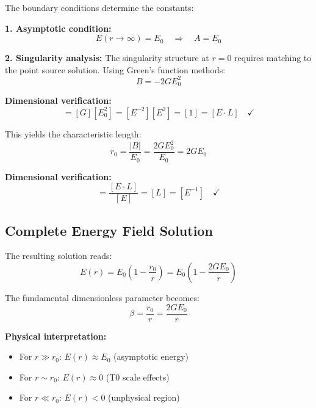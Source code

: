\documentclass[12pt,a4paper]{report}
\newcommand{\rzero}{r_0}                  %
\begin{document}
The boundary conditions determine the constants:

\textbf{1. Asymptotic condition:}
\begin{equation}
	E(r \to \infty) = E_0 \quad \Rightarrow \quad A = E_0
\end{equation}

\textbf{2. Singularity analysis:}
The singularity structure at $r = 0$ requires matching to the point source solution. Using Green's function methods:
\begin{equation}
	B = -2GE_0^2
\end{equation}

\textbf{Dimensional verification:}
\begin{equation}
	[B] = [G][E_0^2] = [E^{-2}][E^2] = [1] = [E \cdot L] \quad \checkmark
\end{equation}

This yields the characteristic length:
\begin{equation}
	\boxed{\rzero = \frac{|B|}{E_0} = \frac{2GE_0^2}{E_0} = 2GE_0}
\end{equation}

\textbf{Dimensional verification:}
\begin{equation}
	[\rzero] = \frac{[E \cdot L]}{[E]} = [L] = [E^{-1}] \quad \checkmark
\end{equation}

\subsection{Complete Energy Field Solution}
\label{subsec:complete_solution}

The resulting solution reads:
\begin{equation}
	\boxed{E(r) = E_0\left(1 - \frac{\rzero}{r}\right) = E_0\left(1 - \frac{2GE_0}{r}\right)}
	\label{eq:complete_energy_solution}
\end{equation}

The fundamental dimensionless parameter becomes:
\begin{equation}
	\beta = \frac{\rzero}{r} = \frac{2GE_0}{r}
\end{equation}

\textbf{Physical interpretation:}
\begin{itemize}
	\item For $r \gg \rzero$: $E(r) \approx E_0$ (asymptotic energy)
	\item For $r \sim \rzero$: $E(r) \approx 0$ (T0 scale effects)
	\item For $r \ll \rzero$: $E(r) < 0$ (unphysical region)
\end{itemize}
\end{document}
